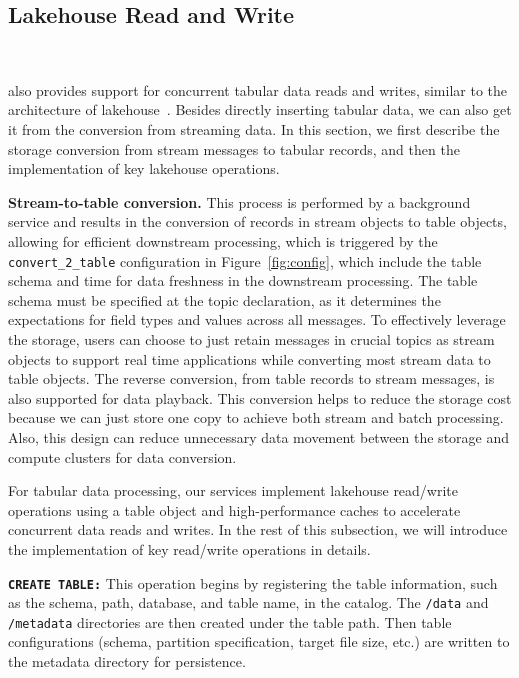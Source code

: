 \subsection{Lakehouse Read and Write}~\label{subsec:lakehouse}

 \sys also provides support for concurrent tabular data reads and writes, similar to  the architecture of lakehouse~\cite{}.
 Besides directly inserting tabular data, we can also get it from the conversion from streaming data.
  In this section, we first  describe the storage conversion from stream messages to tabular records, and then the implementation of key lakehouse operations.
 

\noindent \textbf{Stream-to-table conversion.} This process is performed by a background service and results in the conversion of records in stream objects to table objects, allowing for efficient downstream processing, which is triggered by the \texttt{convert\_2\_table} configuration in Figure~\ref{fig:config}, which include the table schema and time for data freshness in the downstream processing.  The table schema must be specified at the topic declaration, as it determines the expectations for field types and values across all messages. 
 To effectively leverage the storage, users  can choose to just retain messages in crucial topics as stream objects  to support real time applications while converting most stream data to table objects.  The reverse conversion, from table records to stream messages, is also supported for data playback. 
 This conversion helps to reduce the storage cost because we can just store one copy to achieve both stream and batch processing. Also, this design can reduce unnecessary data movement between the storage and compute clusters for data conversion.




For tabular data processing, our \sys services implement lakehouse read/write operations using a table object and high-performance caches to accelerate concurrent data reads and writes. In the rest of this subsection, we will introduce the implementation of key read/write operations in details.

\noindent \textbf{\texttt{CREATE TABLE:}} This operation begins by registering the table information, such as the schema, path, database, and table name, in the catalog. The \texttt{/data} and \texttt{/metadata} directories are then created under the table path. Then table configurations (schema, partition specification, target file size, etc.) are written to the metadata directory for persistence.



